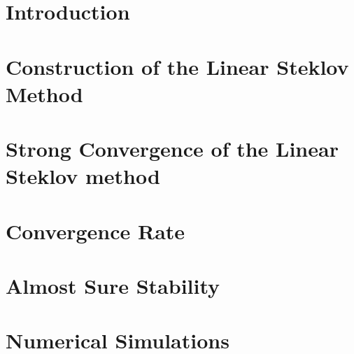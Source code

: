 \label{paper:paperB}
	\section{Introduction}\label{sec:IntroPaperB}
		
		
	\section{Construction of the Linear Steklov  Method}\label{sec:LSConstruction}
		
	\section{Strong Convergence of the Linear Steklov method}\label{sec:LSStrongConvergence}
		
	\section{Convergence Rate}\label{sec:LSConvergenceOrder}
		
	\section{Almost Sure Stability}
		
	\section{Numerical Simulations}\label{sec:LSNumericalResults}
		